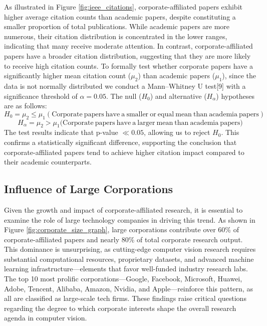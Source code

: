 \documentclass{article}
\begin{document}
As illustrated in Figure \ref{fig:ieee_citations}, corporate-affiliated papers exhibit higher average citation counts than academic papers, despite constituting a smaller proportion of total publications. While academic papers are more numerous, their citation distribution is concentrated in the lower ranges, indicating that many receive moderate attention. In contrast, corporate-affiliated papers have a broader citation distribution, suggesting that they are more likely to receive high citation counts. To formally test whether corporate papers have a significantly higher mean citation count ($\mu_2$) than academic papers ($\mu_1$), since the data is not normally distributed we conduct a Mann–Whitney U test[9] with a significance threshold of $\alpha = 0.05$. The null ($H_0$) and alternative ($H_\alpha$) hypotheses are as follows:
\[
H_0 = \mu_2 \leq \mu_1 (\mathrm{Corporate \ papers\ have \ a \ smaller \ or \ equal \ mean \ than \ academia \ papers})
\]
\[
H_\alpha = \mu_2 > \mu_1 (\mathrm{Corporate \ papers\ have \ a \ larger \ mean\ than \ academia \ papers)}
\]
The test results indicate that p-value $\ll 0.05$, allowing us to reject $H_0$. This confirms a statistically significant difference, supporting the conclusion that corporate-affiliated papers tend to achieve higher citation impact compared to their academic counterparts.   
\vspace{-7pt}
\subsection{Influence of Large Corporations}
\vspace{-7pt}
Given the growth and impact of corporate-affiliated research, it is essential to examine the role of large technology companies in driving this trend. As shown in Figure \ref{fig:corporate_size_graph}, large corporations contribute over 60\% of corporate-affiliated papers and nearly 80\% of total corporate research output. This dominance is unsurprising, as cutting-edge computer vision research requires substantial computational resources, proprietary datasets, and advanced machine learning infrastructure—elements that favor well-funded industry research labs. The top 10 most prolific corporations—Google, Facebook, Microsoft, Huawei, Adobe, Tencent, Alibaba, Amazon, Nvidia, and Apple—reinforce this pattern, as all are classified as large-scale tech firms. These findings raise critical questions regarding the degree to which corporate interests shape the overall research agenda in computer vision.
\end{document}
